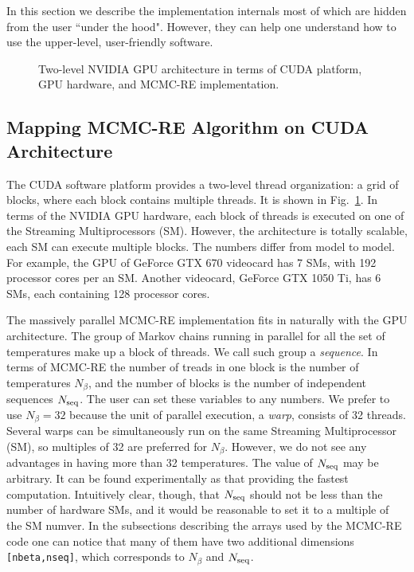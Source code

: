\documentclass[preprint2]{aastex}
\begin{document}
In this section we describe the implementation internals most of which are hidden 
from the user ``under the hood". However, they can help one understand how to 
use the upper-level, user-friendly software.


\begin{figure}[ht!]    %
\caption{\small Two-level NVIDIA GPU architecture in terms of CUDA platform, GPU hardware, and MCMC-RE implementation.
\label{mcmc_cuda_hw}}
\end{figure}


\subsection{Mapping MCMC-RE Algorithm on CUDA Architecture}

The CUDA software platform provides a two-level thread organization: a grid of 
blocks, where each block contains multiple threads. It is shown in Fig.~\ref{mcmc_cuda_hw}.
In terms of the NVIDIA GPU hardware, each block of threads is executed on
one of the Streaming Multiprocessors (SM). However, the architecture is
totally scalable, each SM can execute multiple blocks. The numbers differ
from model to model. For example, the GPU of GeForce GTX 670 videocard
has 7 SMs, with 192 processor cores per an SM. Another videocard,
GeForce GTX 1050 Ti, has 6 SMs, each containing 128 processor cores. 

The massively parallel MCMC-RE implementation fits in naturally with the
GPU architecture. The group of Markov chains running in parallel for all the set 
of temperatures make up a block of threads. We call such group a \emph{sequence}.
In terms of MCMC-RE the number of treads in one block is the number of 
temperatures $N_\beta$, and the number of blocks is the number of independent
sequences $N_{\rm seq}$. The user can set these variables to any numbers.
We prefer to use $N_\beta = 32$ because the unit of parallel execution, a
\emph{warp}, consists of 32 threads. Several warps can be simultaneously 
run on the same Streaming Multiprocessor (SM), so multiples of 32 are
preferred for $N_\beta$. However, we do not see any advantages in having
more than 32 temperatures.  The value of $N_{\rm seq}$ may be arbitrary.
It can be found experimentally as that providing the fastest computation. 
Intuitively clear, though, that $N_{\rm seq}$ should not be less than the
number of hardware SMs, and it would be reasonable to set it to a multiple
of the SM numver. In the subsections describing the arrays
used by the MCMC-RE code one can notice that many of them have 
two additional dimensions \verb|[nbeta,nseq]|, which corresponds to
$N_\beta$ and $N_{\rm seq}$.
\end{document}
